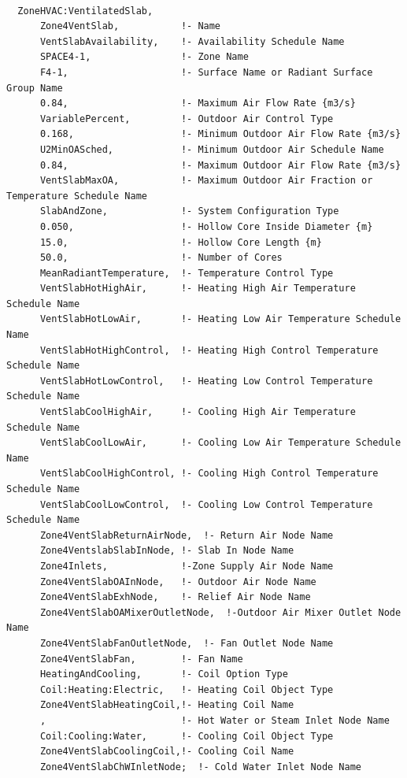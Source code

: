 \begin{lstlisting}

  ZoneHVAC:VentilatedSlab,
      Zone4VentSlab,           !- Name
      VentSlabAvailability,    !- Availability Schedule Name
      SPACE4-1,                !- Zone Name
      F4-1,                    !- Surface Name or Radiant Surface Group Name
      0.84,                    !- Maximum Air Flow Rate {m3/s}
      VariablePercent,         !- Outdoor Air Control Type
      0.168,                   !- Minimum Outdoor Air Flow Rate {m3/s}
      U2MinOASched,            !- Minimum Outdoor Air Schedule Name
      0.84,                    !- Maximum Outdoor Air Flow Rate {m3/s}
      VentSlabMaxOA,           !- Maximum Outdoor Air Fraction or Temperature Schedule Name
      SlabAndZone,             !- System Configuration Type
      0.050,                   !- Hollow Core Inside Diameter {m}
      15.0,                    !- Hollow Core Length {m}
      50.0,                    !- Number of Cores
      MeanRadiantTemperature,  !- Temperature Control Type
      VentSlabHotHighAir,      !- Heating High Air Temperature Schedule Name
      VentSlabHotLowAir,       !- Heating Low Air Temperature Schedule Name
      VentSlabHotHighControl,  !- Heating High Control Temperature Schedule Name
      VentSlabHotLowControl,   !- Heating Low Control Temperature Schedule Name
      VentSlabCoolHighAir,     !- Cooling High Air Temperature Schedule Name
      VentSlabCoolLowAir,      !- Cooling Low Air Temperature Schedule Name
      VentSlabCoolHighControl, !- Cooling High Control Temperature Schedule Name
      VentSlabCoolLowControl,  !- Cooling Low Control Temperature Schedule Name
      Zone4VentSlabReturnAirNode,  !- Return Air Node Name
      Zone4VentslabSlabInNode, !- Slab In Node Name
      Zone4Inlets,             !-Zone Supply Air Node Name
      Zone4VentSlabOAInNode,   !- Outdoor Air Node Name
      Zone4VentSlabExhNode,    !- Relief Air Node Name
      Zone4VentSlabOAMixerOutletNode,  !-Outdoor Air Mixer Outlet Node Name
      Zone4VentSlabFanOutletNode,  !- Fan Outlet Node Name
      Zone4VentSlabFan,        !- Fan Name
      HeatingAndCooling,       !- Coil Option Type
      Coil:Heating:Electric,   !- Heating Coil Object Type
      Zone4VentSlabHeatingCoil,!- Heating Coil Name
      ,                        !- Hot Water or Steam Inlet Node Name
      Coil:Cooling:Water,      !- Cooling Coil Object Type
      Zone4VentSlabCoolingCoil,!- Cooling Coil Name
      Zone4VentSlabChWInletNode;  !- Cold Water Inlet Node Name
\end{lstlisting}

